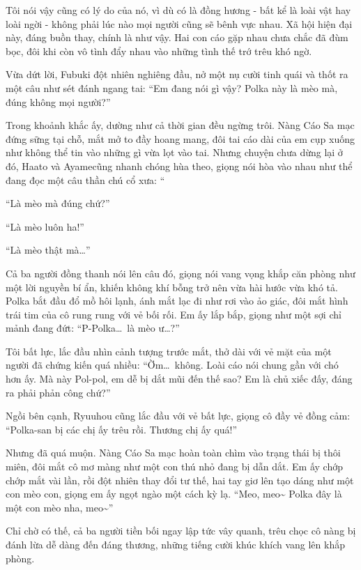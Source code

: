 \documentclass[../main.tex]{subfiles}
\begin{document}
Tôi nói vậy cũng có lý do của nó, vì dù có là đồng hương - bất kể là loài vật hay loài ngời - không phải lúc nào mọi người cũng sẽ bênh vực nhau. Xã hội hiện đại này, đáng buồn thay, chính là như vậy. Hai con cáo gặp nhau chưa chắc đã đùm bọc, đôi khi còn vô tình đẩy nhau vào những tình thế trớ trêu khó ngờ.

Vừa dứt lời, Fubuki đột nhiên nghiêng đầu, nở một nụ cười tinh quái và thốt ra một câu như sét đánh ngang tai: ``Em đang nói gì vậy? Polka này là mèo mà, đúng không mọi người?''

Trong khoảnh khắc ấy, dường như cả thời gian đều ngừng trôi. Nàng Cáo Sa mạc đứng sững tại chỗ, mắt mở to đầy hoang mang, đôi tai cáo dài của em cụp xuống như không thể tin vào những gì vừa lọt vào tai. Nhưng chuyện chưa dừng lại ở đó, Haato và Ayamecũng nhanh chóng hùa theo, giọng nói hòa vào nhau như thể đang đọc một câu thần chú cổ xưa: ``

``Là mèo mà đúng chứ?''

``Là mèo luôn ha!''

``Là mèo thật mà\dots''

Cả ba người đồng thanh nói lên câu đó, giọng nói vang vọng khắp căn phòng như một lời nguyền bí ẩn, khiến không khí bỗng trở nên vừa hài hước vừa khó tả. Polka bắt đầu đổ mồ hôi lạnh, ánh mắt lạc đi như rơi vào ảo giác, đôi mắt hình trái tim của cô rung rung với vẻ bối rối. Em ấy lắp bắp, giọng như một sợi chỉ mảnh đang đứt: ``P-Polka\dots\ là mèo ư\dots?''


Tôi bất lực, lắc đầu nhìn cảnh tượng trước mắt, thở dài với vẻ mặt của một người đã chứng kiến quá nhiều: ``Ờm\dots\ không. Loài cáo nói chung gần với chó hơn ấy. Mà này Pol-pol, em dễ bị dắt mũi đến thế sao? Em là chủ xiếc đấy, đáng ra phải phản công chứ?''

Ngồi bên cạnh, Ryuuhou cũng lắc đầu với vẻ bất lực, giọng cô đầy vẻ đồng cảm: ``Polka-san bị các chị ấy trêu rồi. Thương chị ấy quá!''

Nhưng đã quá muộn. Nàng Cáo Sa mạc hoàn toàn chìm vào trạng thái bị thôi miên, đôi mắt cô mơ màng như một con thú nhỏ đang bị dẫn dắt. Em ấy chớp chớp mắt vài lần, rồi đột nhiên thay đổi tư thế, hai tay giơ lên tạo dáng như một con mèo con, giọng em ấy ngọt ngào một cách kỳ lạ. ``Meo, meo\~{} Polka đây là một con mèo nha, meo\~{}''

Chỉ chờ có thế, cả ba người tiền bối ngay lập tức vây quanh, trêu chọc cô nàng bị đánh lừa dễ dàng đến đáng thương, những tiếng cười khúc khích vang lên khắp phòng.
\end{document}
